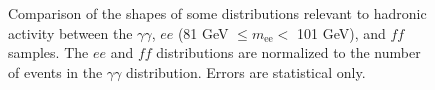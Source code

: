 \documentclass[dissertation.tex]{subfiles}
\begin{document}
\begin{figure}
	\caption{Comparison of the shapes of some distributions relevant to hadronic activity between the $\gamma\gamma$, $ee$ (81 GeV $\leq m_{\mathrm{ee}} <$ 101 GeV), and $\mathit{ff}$ samples.  The $ee$ and $\mathit{ff}$ distributions are normalized to the number of events in the $\gamma\gamma$ distribution.  Errors are statistical only.}
	\label{fig:hadronic_activity}
\end{figure}
\end{document}
